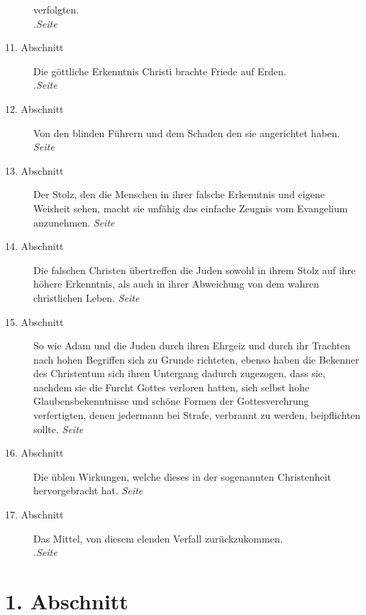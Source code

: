 \begin{description}
verfolgten.\\
.\dotfill \textit{Seite~\pageref{kap7_ab10}}\\
\item[11. Abschnitt] Die göttliche Erkenntnis Christi brachte Friede auf Erden.\\
.\dotfill \textit{Seite~\pageref{kap7_ab11}}\\
\item[12. Abschnitt] Von den blinden Führern und dem Schaden den sie angerichtet
haben.
\dotfill \textit{Seite~\pageref{kap7_ab12}}\\
\item[13. Abschnitt] Der Stolz, den die Menschen in ihrer falsche Erkenntnis und
eigene Weisheit sehen, macht sie unfähig das einfache Zeugnis vom Evangelium
anzunehmen.
\dotfill \textit{Seite~\pageref{kap7_ab13}}\\
\item[14. Abschnitt] Die falschen Christen übertreffen die Juden sowohl in ihrem
Stolz auf ihre höhere Erkenntnis, als auch in ihrer Abweichung von dem wahren
christlichen Leben.
\dotfill \textit{Seite~\pageref{kap7_ab14}}\\
\item[15. Abschnitt] So wie Adam und die Juden durch ihren Ehrgeiz und durch ihr
Trachten nach hohen Begriffen sich zu Grunde richteten, ebenso haben die
Bekenner des Christentum sich ihren Untergang dadurch zugezogen, dass sie,
nachdem sie die Furcht Gottes verloren hatten, sich selbst hohe
Glaubensbekenntnisse und schöne Formen der Gottesverehrung verfertigten, denen
jedermann bei Strafe, verbrannt zu werden, beipflichten sollte.
\dotfill \textit{Seite~\pageref{kap7_ab15}}\\
\item[16. Abschnitt] Die üblen Wirkungen, welche dieses in der sogenannten
Christenheit hervorgebracht hat.
\dotfill \textit{Seite~\pageref{kap7_ab16}}\\
\item[17. Abschnitt] Das Mittel, von diesem elenden Verfall zurückzukommen.\\
.\dotfill \textit{Seite~\pageref{kap7_ab17}}\\

\end{description}

\newpage

\section{1. Abschnitt} \label{kap7_ab1}

